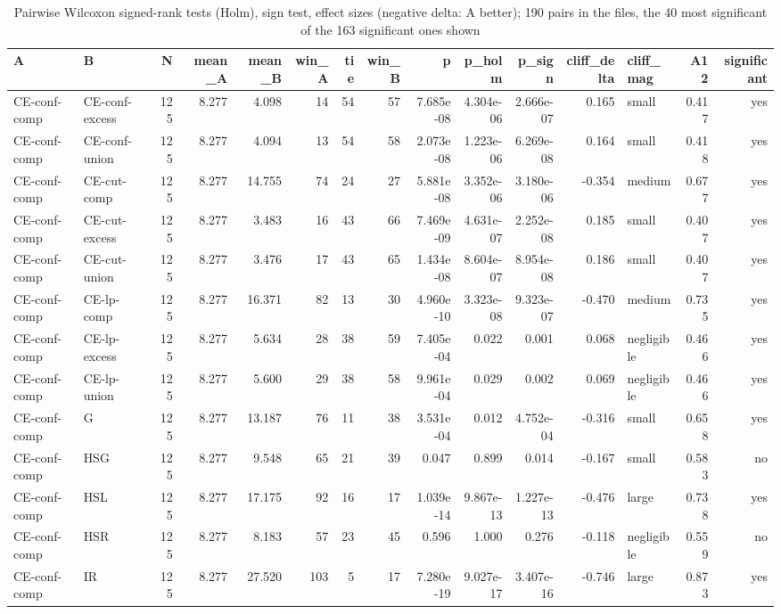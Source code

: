 \begin{table}[htbp]
\centering
\small
\caption{Pairwise Wilcoxon signed-rank tests (Holm), sign test, effect sizes (negative delta: A better); 190 pairs in the files, the 40 most significant of the 163 significant ones shown}
\label{tab:E2_head_to_head_pairwise}
\begin{tabular}{llrrrrrrrrrrlrr}
\toprule
A & B & N & mean\_A & mean\_B & win\_A & tie & win\_B & p & p\_holm & p\_sign & cliff\_delta & cliff\_mag & A12 & significant \\
\midrule
CE-conf-comp & CE-conf-excess & 125 & 8.277 & 4.098 & 14 & 54 & 57 & 7.685e-08 & 4.304e-06 & 2.666e-07 & 0.165 & small & 0.417 & yes \\
CE-conf-comp & CE-conf-union & 125 & 8.277 & 4.094 & 13 & 54 & 58 & 2.073e-08 & 1.223e-06 & 6.269e-08 & 0.164 & small & 0.418 & yes \\
CE-conf-comp & CE-cut-comp & 125 & 8.277 & 14.755 & 74 & 24 & 27 & 5.881e-08 & 3.352e-06 & 3.180e-06 & -0.354 & medium & 0.677 & yes \\
CE-conf-comp & CE-cut-excess & 125 & 8.277 & 3.483 & 16 & 43 & 66 & 7.469e-09 & 4.631e-07 & 2.252e-08 & 0.185 & small & 0.407 & yes \\
CE-conf-comp & CE-cut-union & 125 & 8.277 & 3.476 & 17 & 43 & 65 & 1.434e-08 & 8.604e-07 & 8.954e-08 & 0.186 & small & 0.407 & yes \\
CE-conf-comp & CE-lp-comp & 125 & 8.277 & 16.371 & 82 & 13 & 30 & 4.960e-10 & 3.323e-08 & 9.323e-07 & -0.470 & medium & 0.735 & yes \\
CE-conf-comp & CE-lp-excess & 125 & 8.277 & 5.634 & 28 & 38 & 59 & 7.405e-04 & 0.022 & 0.001 & 0.068 & negligible & 0.466 & yes \\
CE-conf-comp & CE-lp-union & 125 & 8.277 & 5.600 & 29 & 38 & 58 & 9.961e-04 & 0.029 & 0.002 & 0.069 & negligible & 0.466 & yes \\
CE-conf-comp & G & 125 & 8.277 & 13.187 & 76 & 11 & 38 & 3.531e-04 & 0.012 & 4.752e-04 & -0.316 & small & 0.658 & yes \\
CE-conf-comp & HSG & 125 & 8.277 & 9.548 & 65 & 21 & 39 & 0.047 & 0.899 & 0.014 & -0.167 & small & 0.583 & no \\
CE-conf-comp & HSL & 125 & 8.277 & 17.175 & 92 & 16 & 17 & 1.039e-14 & 9.867e-13 & 1.227e-13 & -0.476 & large & 0.738 & yes \\
CE-conf-comp & HSR & 125 & 8.277 & 8.183 & 57 & 23 & 45 & 0.596 & 1.000 & 0.276 & -0.118 & negligible & 0.559 & no \\
CE-conf-comp & IR & 125 & 8.277 & 27.520 & 103 & 5 & 17 & 7.280e-19 & 9.027e-17 & 3.407e-16 & -0.746 & large & 0.873 & yes \\

\end{tabular}
\end{table}
